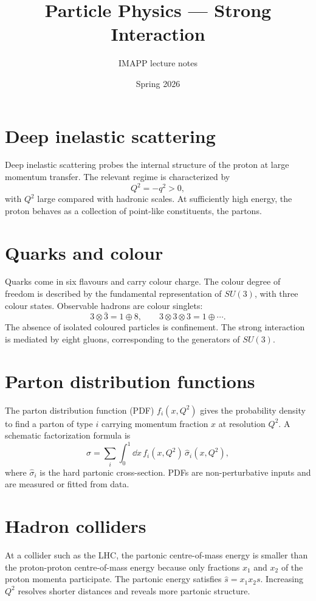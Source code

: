\documentclass[11pt,a4paper]{article}
\title{Particle Physics --- Strong Interaction}
\author{IMAPP lecture notes}
\date{Spring 2026}
\begin{document}
\maketitle

\section{Deep inelastic scattering}
Deep inelastic scattering probes the internal structure of the proton at large momentum transfer. The relevant regime is characterized by
\[
Q^2=-q^2>0,
\]
with $Q^2$ large compared with hadronic scales. At sufficiently high energy, the proton behaves as a collection of point-like constituents, the partons.

\section{Quarks and colour}
Quarks come in six flavours and carry colour charge. The colour degree of freedom is described by the fundamental representation of $SU(3)$, with three colour states. Observable hadrons are colour singlets:
\[
3\otimes\bar 3=1\oplus8,\qquad 3\otimes3\otimes3=1\oplus\cdots.
\]
The absence of isolated coloured particles is confinement. The strong interaction is mediated by eight gluons, corresponding to the generators of $SU(3)$.

\section{Parton distribution functions}
The parton distribution function (PDF) $f_i(x,Q^2)$ gives the probability density to find a parton of type $i$ carrying momentum fraction $x$ at resolution $Q^2$. A schematic factorization formula is
\[
\sigma=\sum_i\int_0^1\dd x\,f_i(x,Q^2)\,\hat\sigma_i(x,Q^2),
\]
where $\hat\sigma_i$ is the hard partonic cross-section. PDFs are non-perturbative inputs and are measured or fitted from data.

\section{Hadron colliders}
At a collider such as the LHC, the partonic centre-of-mass energy is smaller than the proton-proton centre-of-mass energy because only fractions $x_1$ and $x_2$ of the proton momenta participate. The partonic energy satisfies $\hat s=x_1x_2s$. Increasing $Q^2$ resolves shorter distances and reveals more partonic structure.
\end{document}
